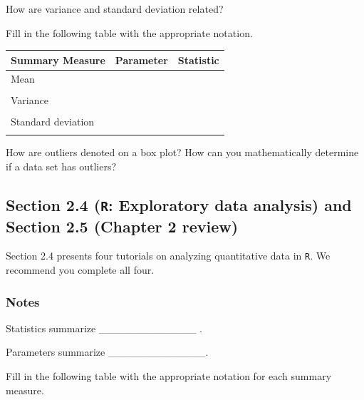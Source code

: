 \documentclass[
]{report}
\newcommand{\rgs}{\vspace{12pt}} %
\begin{document}
How are variance and standard deviation related?
\rgs

Fill in the following table with the appropriate notation.

\begin{center}
\begin{tabular}{|l|p{2in}|p{2in}|} \hline
Summary Measure & Parameter & Statistic \\ \hline
Mean & & \\ 
& & \\ \hline
Variance & & \\ 
& & \\ \hline
Standard deviation & & \\ 
& & \\ \hline
\end{tabular}
\end{center}

How are outliers denoted on a box plot? How can you mathematically determine if a data set has outliers?
\rgs
\rgs

\hypertarget{section-2.4-r-exploratory-data-analysis-and-section-2.5-chapter-2-review}{%
\subsection*{\texorpdfstring{Section 2.4 (\texttt{R}: Exploratory data analysis) and Section 2.5 (Chapter 2 review)}{Section 2.4 (R: Exploratory data analysis) and Section 2.5 (Chapter 2 review)}}\label{section-2.4-r-exploratory-data-analysis-and-section-2.5-chapter-2-review}}

Section 2.4 presents four tutorials on analyzing quantitative data in \texttt{R}. We recommend you complete all four.

\hypertarget{notes-7}{%
\subsubsection*{Notes}\label{notes-7}}

Statistics summarize \_\_\_\_\_\_\_\_\_\_\_\_\_ .

Parameters summarize \_\_\_\_\_\_\_\_\_\_\_\_\_.

\newpage

Fill in the following table with the appropriate notation for each summary measure.
\end{document}
